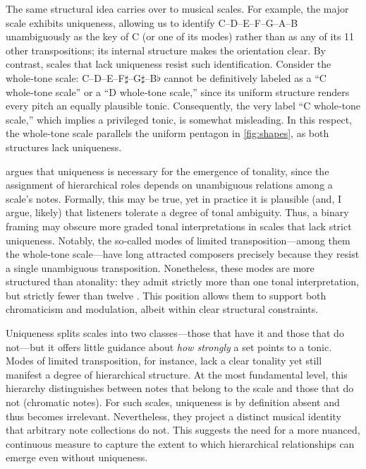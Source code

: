 \documentclass[10pt,twocolumn]{article}
\numberwithin{equation}{section} %
\begin{document}
    The same structural idea carries over to musical scales.
    For example, the major scale exhibits uniqueness, allowing us to identify C–D–E–F–G–A–B unambiguously as the key of C (or one of its modes) rather than as any of its 11 other transpositions; its internal structure makes the orientation clear.
    By contrast, scales that lack uniqueness resist such identification.
    Consider the whole‑tone scale: C–D–E–F$\sharp$–G$\sharp$–B$\flat$ cannot be definitively labeled as a “C whole‑tone scale” or a “D whole‑tone scale,” since its uniform structure renders every pitch an equally plausible tonic.
    Consequently, the very label “C whole‑tone scale,” which implies a privileged tonic, is somewhat misleading.
    In this respect, the whole‑tone scale parallels the uniform pentagon in \autoref{fig:shapes}, as both structures lack uniqueness.

    \citet{Balzano1982} argues that uniqueness is necessary for the emergence of tonality, since the assignment of hierarchical roles depends on unambiguous relations among a scale’s notes.
    Formally, this may be true, yet in practice it is plausible (and, I argue, likely) that listeners tolerate a degree of tonal ambiguity.
    Thus, a binary framing may obscure more graded tonal interpretations in scales that lack strict uniqueness.
    Notably, the so‑called modes of limited transposition—among them the whole‑tone scale—have long attracted composers precisely because they resist a single unambiguous transposition.
    Nonetheless, these modes are more structured than atonality: they admit strictly more than one tonal interpretation, but strictly fewer than twelve \citep{Messiaen1944}.
    This position allows them to support both chromaticism and modulation, albeit within clear structural constraints.

    Uniqueness splits scales into two classes—those that have it and those that do not—but it offers little guidance about \emph{how strongly} a set points to a tonic.
    Modes of limited transposition, for instance, lack a clear tonality yet still manifest a degree of hierarchical structure.
    At the most fundamental level, this hierarchy distinguishes between notes that belong to the scale and those that do not (chromatic notes).
    For such scales, uniqueness is by definition absent and thus becomes irrelevant.
    Nevertheless, they project a distinct musical identity that arbitrary note collections do not.
    This suggests the need for a more nuanced, continuous measure to capture the extent to which hierarchical relationships can emerge even without uniqueness.
\end{document}

